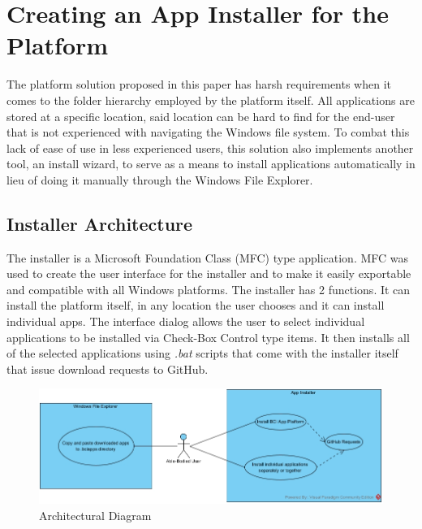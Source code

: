 
\chapter{Creating an App Installer for the Platform}\label{cap:installer}
The platform solution proposed in this paper has harsh requirements when it comes to the folder hierarchy employed by the platform itself. All applications are stored at a specific location, said location can be hard to find for the end-user that is not experienced with navigating the Windows file system. To combat this lack of ease of use in less experienced users, this solution also implements another tool, an install wizard, to serve as a means to install applications automatically in lieu of doing it manually through the Windows File Explorer.


\section{Installer Architecture}
The installer is a Microsoft Foundation Class (MFC) type application. MFC was used to create the user interface for the installer and to make it easily exportable and compatible with all Windows platforms. The installer has 2 functions. It can install the platform itself, in any location the user chooses and it can install individual apps. The interface dialog allows the user to select individual applications to be installed via Check-Box Control type items. It then installs all of the selected applications using \textit{.bat} scripts that come with the installer itself that issue download requests to GitHub.

\begin{figure}[H]
  \centering
  \includegraphics[width=1\textwidth]{Diagrams/Installer Use Case.jpg}
  \caption{Architectural Diagram}
\end{figure}



